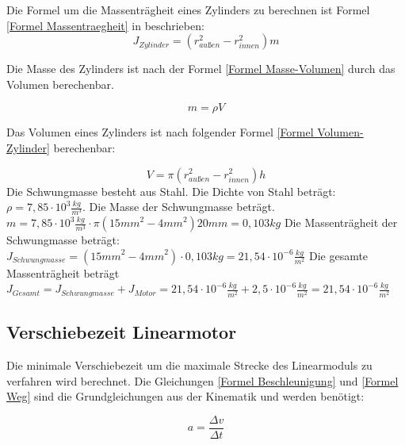 \documentclass[10pt,a4paper,oneside,abstracton]{scrartcl}
\begin{document}
Die Formel um die Massenträgheit eines Zylinders zu berechnen ist 
Formel \ref*{Formel Massentraegheit} in beschrieben: 
\begin{equation}
	J_{Zylinder} = (r_{außen}^2 - r_{innen}^2) m
	\label{Formel Massentraegheit}
\end{equation}

Die Masse des Zylinders ist nach der Formel \ref*{Formel Masse-Volumen} durch das Volumen berechenbar. 

\begin{equation}
	m = \rho V
	\label{Formel Masse-Volumen}
\end{equation}

Das Volumen eines Zylinders ist nach folgender Formel \ref*{Formel Volumen-Zylinder} berechenbar: 

\begin{equation}
	V = \pi (r_{außen}^2 - r_{innen}^2) h
	\label{Formel Volumen-Zylinder}
\end{equation}
\newline
Die Schwungmasse besteht aus Stahl. Die Dichte von Stahl beträgt: $\rho = 7,85 \cdot 10^{3}\frac{kg}{m^3}$.
\newline
Die Masse der Schwungmasse beträgt.
\newline
	$ m = 7,85 \cdot 10^{3}\frac{kg}{m^3} \cdot \pi ({15 mm}^2 - {4 mm}^2) 20 mm = 0,103 kg$
\newline
	Die Massenträgheit der Schwungmasse beträgt: 
	\newline
	$ J_{Schwungmasse} = ({15 mm}^2 - {4 mm}^2) \cdot 0,103 kg = 21,54 \cdot 10^{-6} \frac{kg}{m^2}$
	Die gesamte Massenträgheit beträgt 
	\newline
	$J_{Gesamt} =  J_{Schwungmasse}+ J_{Motor} = 21,54 \cdot 10^{-6} \frac{kg}{m^2} + 2,5 \cdot 10^{-6} \frac{kg}{m^2}= 21,54 \cdot 10^{-6} \frac{kg}{m^2}$
	\newline
	\newline
	\subsection{Verschiebezeit Linearmotor}
	Die minimale Verschiebezeit um die maximale Strecke des Linearmoduls zu verfahren wird berechnet. 
	\newline
	Die Gleichungen \ref*{Formel Beschleunigung} und \ref*{Formel Weg} sind die Grundgleichungen aus der Kinematik und werden benötigt:

\begin{equation}
	a = \frac{\Delta v}{\Delta t}
	\label{Formel Beschleunigung}
\end{equation}
\end{document}
